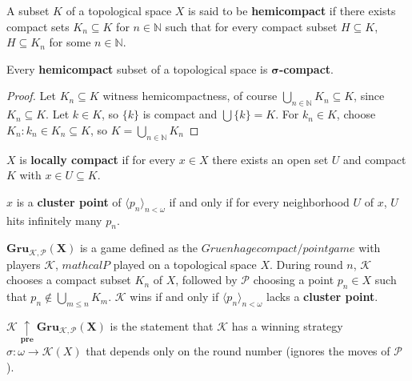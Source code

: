 \documentclass{article}
\begin{document}
	\begin{definition}
	  A subset \(K\) of a topological space \(X\) is said to be \textbf{hemicompact} if there exists compact sets $K_n \subseteq K$ for $n \in \mathbb{N}$ such that for every compact subset \(H\subseteq K\), \(H\subseteq K_n\) for some \(n\in\mathbb N\).
	\end{definition}

	\begin{theorem}
		Every \textbf{hemicompact} subset of a topological space is \(\boldsymbol{\sigma}\)\textbf{-compact}.
	\end{theorem}
	\begin{proof}
		Let $K_n \subseteq K$ witness hemicompactness, of course $\underset{n \in \mathbb{N}}{\bigcup}K_n \subseteq K$, since $K_n \subseteq K$. Let $k \in K$, so $\lbrace k \rbrace$ is compact and $\bigcup\lbrace k \rbrace = K$. For $k_n \in K$, choose $K_n : k_n \in K_n \subseteq K$, so $K = \underset{n \in \mathbb{N}}{\bigcup}K_n$
	\end{proof}

	\begin{definition}
		$X$ is \textbf{locally compact} if for every $x \in X$ there exists an open set $U$ and compact $K$ with $x \in U \subseteq K$.
	\end{definition}
	
	\begin{definition}
		$x$ is a \textbf{cluster point} of $\langle p_n \rangle_{n < \omega}$ if and only if for every neighborhood $U$ of $x$, $U$ hits infinitely many $p_n$.
	\end{definition}

	\begin{definition}
		$\boldsymbol{Gru_{\mathcal{K},\mathcal{P}}(X)}$ is a game defined as the $Gruenhage compact/point game$ with players $\mathcal{K}$, $mathcal{P}$ played on a topological space $X$. During round $n$, $\mathcal{K}$ chooses a compact subset $K_n$ of $X$, followed by $\mathcal{P}$ choosing a point $p_n \in X$ such that $p_n \not\in \bigcup_{m\leq n}K_m$. $\mathcal{K}$ wins if and only if $\langle p_n \rangle_{n<\omega}$ lacks a \textbf{cluster point}. 
	\end{definition}
	
	\begin{definition}
	$\boldsymbol{\mathcal{K} \underset{pre}{\uparrow} Gru_{\mathcal{K}, \mathcal{P}}(X)}$ is the statement that $\mathcal{K}$ has a winning strategy $\sigma : \omega \rightarrow \mathcal{K}(X)$ that depends only on the round number (ignores the moves of $\mathcal{P}$).
	\end{definition}
\end{document}
